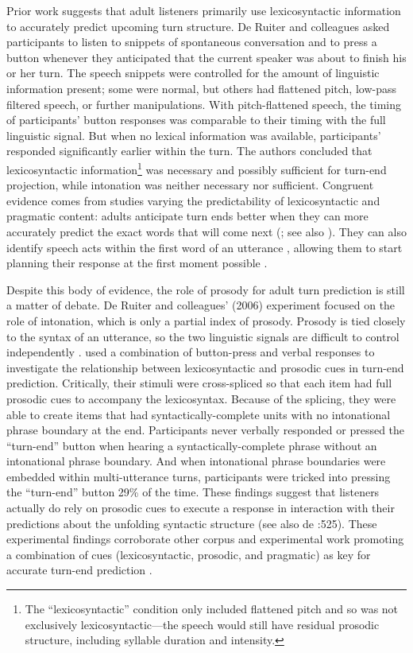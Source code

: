 \documentclass[authoryear, 12pt]{elsarticle}
\begin{document}
Prior work suggests that adult listeners primarily use lexicosyntactic information to accurately predict upcoming turn structure. De Ruiter and colleagues \citeyearpar{de-ruiter2006} asked participants to listen to snippets of spontaneous conversation and to press a button whenever they anticipated that the current speaker was about to finish his or her turn. The speech snippets were controlled for the amount of linguistic information present; some were normal, but others had flattened pitch, low-pass filtered speech, or further manipulations. With pitch-flattened speech, the timing of participants' button responses was comparable to their timing with the full linguistic signal. But when no lexical information was available, participants' responded significantly earlier within the turn. The authors concluded that lexicosyntactic information\footnote{The ``lexicosyntactic'' condition only included flattened pitch and so was not exclusively lexicosyntactic---the speech would still have residual prosodic structure, including syllable duration and intensity.} was necessary and possibly sufficient for turn-end projection, while intonation was neither necessary nor sufficient. Congruent evidence comes from studies varying the predictability of lexicosyntactic and pragmatic content: adults anticipate turn ends better when they can more accurately predict the exact words that will come next (\citealp{magyari2012}; see also \citealp{magyari2014}). They can also identify speech acts within the first word of an utterance \citep{gisladottir2015}, allowing them to start planning their response at the first moment possible \citep{bogels2015}.

Despite this body of evidence, the role of prosody for adult turn prediction is still a matter of debate. De Ruiter and colleagues' (2006) experiment focused on the role of intonation, which is only a partial index of prosody. Prosody is tied closely to the syntax of an utterance, so the two linguistic signals are difficult to control independently \citep{ford1996}. \citet*{torreira2015} used a combination of button-press and verbal responses to investigate the relationship between lexicosyntactic and prosodic cues in turn-end prediction. Critically, their stimuli were cross-spliced so that each item had full prosodic cues to accompany the lexicosyntax. Because of the splicing, they were able to create items that had syntactically-complete units with no intonational phrase boundary at the end. Participants never verbally responded or pressed the ``turn-end'' button when hearing a syntactically-complete phrase without an intonational phrase boundary. And when intonational phrase boundaries were embedded within multi-utterance turns, participants were tricked into pressing the ``turn-end'' button 29\% of the time. These findings suggest that listeners actually do rely on prosodic cues to execute a response in interaction with their predictions about the unfolding syntactic structure (see also de \citet{de-ruiter2006}:525). These experimental findings corroborate other corpus and experimental work promoting a combination of cues (lexicosyntactic, prosodic, and pragmatic) as key for accurate turn-end prediction \citep{duncan1972, ford1996, hirvenkari2013}. 
\end{document}
